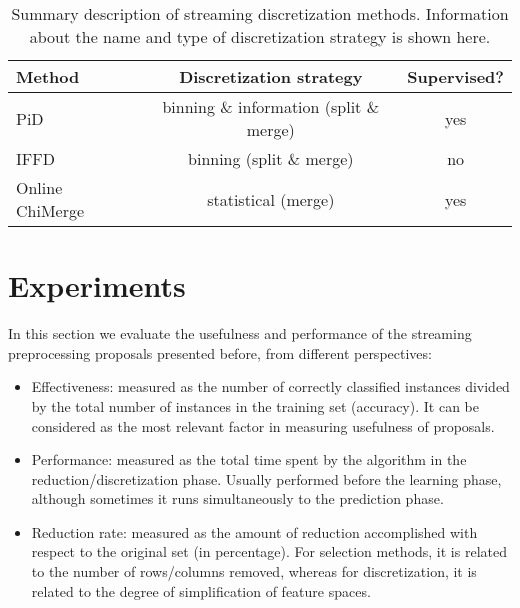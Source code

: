 \documentclass[preprint,12pt]{elsarticle}
\begin{document}
\begin{table}[!htp]
\renewcommand{\arraystretch}{1.3}
\centering
\scriptsize
\caption{Summary description of streaming discretization methods. Information about the name and type of discretization strategy is shown here.}
\label{tab:disc}
\begin{tabular}{lcc}
\toprule
{\bf Method} & {\bf Discretization strategy} & {\bf Supervised?}\\
\midrule
PiD~\cite{gama06} & binning \& information (split \& merge) & yes\\
IFFD~\cite{lu06} & binning (split \& merge) & no \\
Online ChiMerge~\cite{lehti12} &  statistical (merge) & yes\\
\bottomrule
\end{tabular}
\end{table}


\section*{Experiments}

In this section we evaluate the usefulness and performance of the streaming preprocessing proposals presented before, from different perspectives:

\begin{itemize}
	\item Effectiveness: measured as the number of correctly classified instances divided by the total number of instances in the training set (accuracy). It can be considered as the most relevant factor in measuring usefulness of proposals.
	\item Performance: measured as the total time spent by the algorithm in the reduction/discretization phase. Usually performed before the learning phase, although sometimes it runs simultaneously to the prediction phase.
	\item Reduction rate: measured as the amount of reduction accomplished with respect to the original set (in percentage). For selection methods, it is related to the number of rows/columns removed, whereas for discretization, it is related to the degree of simplification of feature spaces.
\end{itemize} 
\end{document}
